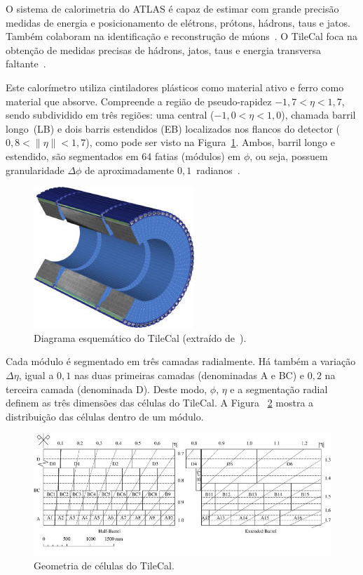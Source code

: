 O sistema de calorimetria do ATLAS é capaz de estimar com grande precisão
medidas de energia e posicionamento de elétrons, prótons, hádrons, taus e jatos.
Também colaboram na identificação e reconstrução de
múons~\cite{AAD2010READINESS}. O TileCal foca na obtenção de medidas precisas de
hádrons, jatos, taus e energia transversa faltante~\cite{MERMOD2008}.

Este calorímetro utiliza cintiladores plásticos como material ativo e ferro
como material que absorve. Compreende a região de pseudo-rapidez $-1,7 < \eta <
1,7$, sendo subdividido em três regiões: uma central  ($-1,0 < \eta < 1,0$),
chamada barril longo~(LB) e dois barris estendidos (EB) localizados nos flancos
do detector ( $0,8 < \|\eta\| < 1,7$), como pode ser visto na
Figura~\ref{fig:tilecalschema}. Ambos, barril longo e estendido, são
segmentados em 64 fatias (módulos) em $\phi$, ou seja, possuem granularidade
$\Delta\phi$ de aproximadamente $0,1$~radianos~\cite{DETECTOR1996TECHNICAL}.

\begin{figure}[htpb!]
    \centering
    \includegraphics{images/TILECAL_modules_schema.jpg}
    \caption[Diagrama esquemático do TileCal]{Diagrama esquemático do TileCal (extraído
    de~\cite{ref:atlas_www}).}
    \label{fig:tilecalschema}
\end{figure}

Cada módulo é segmentado em três camadas radialmente. Há também a variação
$\Delta\eta$,  igual a $0,1$ nas duas primeiras camadas (denominadas A e BC) e
$0,2$ na terceira camada (denominada D). Deste modo, $\phi$, $\eta$ e a
segmentação radial definem as três dimensões das células do TileCal.  A Figura
~\ref{fig:tilecalgeometry} mostra a distribuição das células dentro de um
módulo.

\begin{figure}[htpb!]
    \centering
    \includegraphics[width=\textwidth]{images/tile_geometry.jpg}
    \caption[Geometria de células do TileCal]{Geometria de células do TileCal.}
    \label{fig:tilecalgeometry}
\end{figure}


